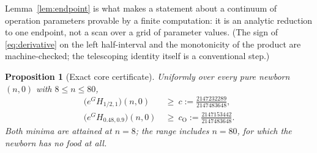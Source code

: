 \documentclass[11pt,a4paper]{article}
\theoremstyle{plain}
\newtheorem{proposition}[theorem]{Proposition}
\theoremstyle{definition}
\theoremstyle{remark}
\begin{document}
Lemma~\ref{lem:endpoint} is what makes a statement about a continuum of operation
parameters provable by a finite computation: it is an analytic reduction to one endpoint,
not a scan over a grid of parameter values. (The sign of \eqref{eq:derivative} on the left
half-interval and the monotonicity of the product are machine-checked; the telescoping
identity itself is a conventional step.)

\begin{proposition}[Exact core certificate]\label{prop:certificate}
Uniformly over every pure newborn $(n,0)$ with $8\le n\le80$,
\begin{align}
\bigl(e^{G}H_{1/2,1}\bigr)(n,0)&\ \ge\ c:=\frac{2147232289}{2147483648},\label{eq:c}\\
\bigl(e^{G}H_{0.48,0.9}\bigr)(n,0)&\ \ge\ c_{\mathrm O}:=\frac{2147153442}{2147483648}.
\label{eq:co}
\end{align}
Both minima are attained at $n=8$; the range includes $n=80$, for which the newborn has
no food at all.
\end{proposition}
\end{document}

